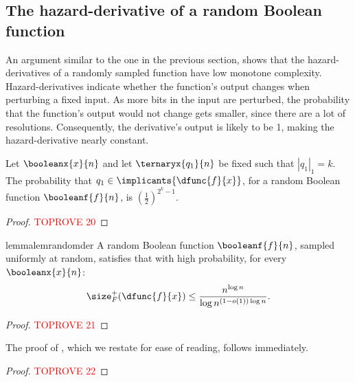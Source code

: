 \documentclass[acmsmall, nonacm, authorversion]{acmart}
\begin{document}
\subsection{The hazard-derivative of a random Boolean function}\label{subsec:hd-random-function}
An argument similar to the one in the previous section, shows that the hazard-derivatives of a randomly sampled function have low monotone complexity. Hazard-derivatives indicate whether the function’s output changes when perturbing a fixed input. As more bits in the input are perturbed, the probability that the function's output would not change gets smaller, since there are a lot of resolutions. Consequently, the derivative's output is likely to be 1, making the hazard-derivative nearly constant. 

\begin{lemma}\label{lem:weight-of-random-pi-df}
Let $\booleanx{x}{n}$ and let $\ternaryx{q_{1}}{n}$ be fixed such that  $|q_{1}|_{1}=k$. The probability that $q_{1}\in \implicants{\dfunc{f}{x}}$, for a random Boolean function  $\booleanf{f}{n}$, is $(\frac{1}{2})^{2^k-1}$.
\end{lemma}
\begin{proof}\textcolor{red}{TOPROVE 20}\end{proof}

\begin{restatable}{lemma}{lemrandomder}\label{lem:random-der}
A random Boolean function $\booleanf{f}{n}$, sampled uniformly at random, 
satisfies that with high probability, for every $\booleanx{x}{n}$:
\[
\size_F^{+}(\dfunc{f}{x})\le\frac{n^{\log n}}{\log n ^{(1-o(1))\log n}}.
\]
\end{restatable}
\begin{proof}\textcolor{red}{TOPROVE 21}\end{proof}

The proof of , which we restate for ease of reading, follows immediately.
\proprandomfunctiongap*
\begin{proof}\textcolor{red}{TOPROVE 22}\end{proof}
\end{document}
